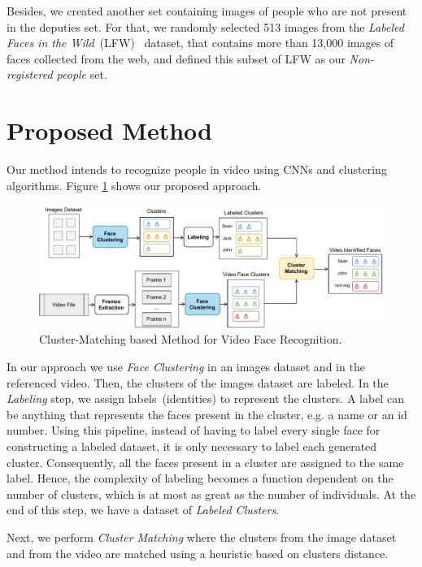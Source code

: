 Besides, we created another set containing images of people who are not present in the deputies set.
For that, we randomly selected 513 images from the \emph{Labeled Faces in the Wild}~(LFW)~\cite{LFWTech} dataset, that contains more than 13,000 images of faces collected from the web,
and defined this subset of LFW as our \emph{Non-registered people} set.

\section{Proposed Method}
\label{sec:recognition_method}

Our method intends to recognize people in video using CNNs and clustering algorithms.
Figure \ref{fig:cluster_matching} shows our proposed approach.

\begin{figure}[!ht]
    \centering
    \includegraphics[width=\textwidth]{img/face_recognition/cluster_matching_process.pdf}
    \caption{Cluster-Matching based Method for Video Face Recognition.}
    \label{fig:cluster_matching}
\end{figure}

In our approach we use \emph{Face Clustering} in an images dataset and in the referenced video. Then, the clusters of the images dataset are labeled. 
In the \textit{Labeling} step, we assign labels~(identities) to represent the clusters.
A label can be anything that represents the faces present in the cluster, e.g. a name or an id number. 
Using this pipeline, instead of having to label every single face for constructing a labeled dataset, it is only necessary to label each generated cluster.
Consequently, all the faces present in a cluster are assigned to the same label. 
Hence, the complexity of labeling becomes a function dependent on the number of clusters, which is at most as great as the number of individuals.
At the end of this step, we have a dataset of \emph{Labeled Clusters}.


Next, we perform \emph{Cluster Matching} where the clusters from the image dataset and from the video are matched using a heuristic based on clusters distance.

